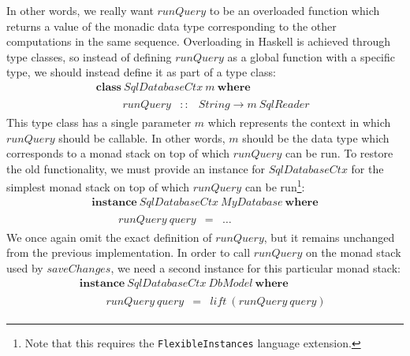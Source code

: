 In other words, we really want $\mathit{runQuery}$ to be an overloaded function which returns a value of the monadic data type corresponding to the other computations in the same sequence. Overloading in Haskell is achieved through type classes, so instead of defining $\mathit{runQuery}$ as a global function with a specific type, we should instead define it as part of a type class:
\begin{displaymath}
\begin{array}{l}
\mathbf{class}~\mathit{SqlDatabaseCtx}~m~\mathbf{where}\\
\qquad \begin{array}{lcl}
\mathit{runQuery} & :: & \mathit{String} \to m~\mathit{SqlReader}
\end{array}
\end{array}
\end{displaymath}
This type class has a single parameter $m$ which represents the context in which $\mathit{runQuery}$ should be callable. In other words, $m$ should be the data type which corresponds to a monad stack on top of which $\mathit{runQuery}$ can be run. To restore the old functionality, we must provide an instance for $\mathit{SqlDatabaseCtx}$ for the simplest monad stack on top of which $\mathit{runQuery}$ can be run\footnote{Note that this requires the \texttt{FlexibleInstances} language extension.}:
\begin{displaymath}
\begin{array}{l}
\mathbf{instance}~\mathit{SqlDatabaseCtx}~\mathit{MyDatabase}~\mathbf{where}\\
\qquad \begin{array}{lcl}
\mathit{runQuery}~\mathit{query} & = & \ldots
\end{array}
\end{array}
\end{displaymath}
We once again omit the exact definition of $\mathit{runQuery}$, but it remains unchanged from the previous implementation. In order to call $\mathit{runQuery}$ on the monad stack used by $\mathit{saveChanges}$, we need a second instance for this particular monad stack:
\begin{displaymath}
\begin{array}{l}
\mathbf{instance}~\mathit{SqlDatabaseCtx}~\mathit{DbModel}~\mathbf{where}\\
\qquad \begin{array}{lcl}
\mathit{runQuery}~\mathit{query} & = & \mathit{lift}~(\mathit{runQuery}~\mathit{query})
\end{array}
\end{array}
\end{displaymath}
